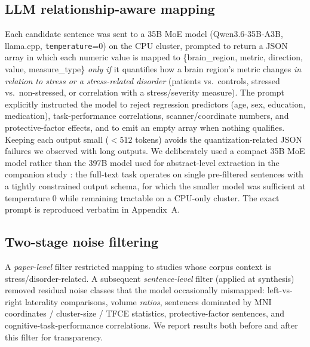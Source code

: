 \documentclass[11pt]{article}
\begin{document}
\subsection{LLM relationship-aware mapping}
Each candidate sentence was sent to a 35B MoE model (Qwen3.6-35B-A3B, llama.cpp,
\texttt{temperature}=0) on the CPU cluster, prompted to return a JSON array in
which each numeric value is mapped to \{brain\_region, metric, direction, value,
measure\_type\} \emph{only if} it quantifies how a brain region's metric changes
\emph{in relation to stress or a stress-related disorder} (patients vs.\
controls, stressed vs.\ non-stressed, or correlation with a stress/severity
measure). The prompt explicitly instructed the model to reject regression
predictors (age, sex, education, medication), task-performance correlations,
scanner/coordinate numbers, and protective-factor effects, and to emit an empty
array when nothing qualifies. Keeping each output small ($<512$ tokens) avoids
the quantization-related JSON failures we observed with long outputs. We
deliberately used a compact 35B MoE model rather than the 397B model used for
abstract-level extraction in the companion study \cite{kang2026scoping}: the
full-text task operates on single pre-filtered sentences with a tightly
constrained output schema, for which the smaller model was sufficient at
temperature 0 while remaining tractable on a CPU-only cluster. The exact prompt
is reproduced verbatim in Appendix~A.

\subsection{Two-stage noise filtering}
A \emph{paper-level} filter restricted mapping to studies whose corpus context is
stress/disorder-related. A subsequent \emph{sentence-level} filter (applied at
synthesis) removed residual noise classes that the model occasionally mismapped:
left-vs-right laterality comparisons, volume \emph{ratios}, sentences dominated by
MNI coordinates / cluster-size / TFCE statistics, protective-factor sentences,
and cognitive-task-performance correlations. We report results both before and
after this filter for transparency.
\end{document}
